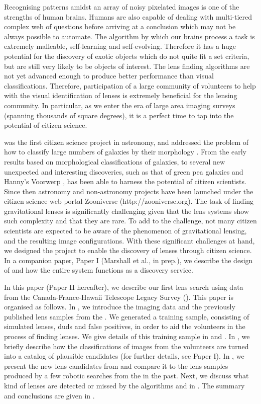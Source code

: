 \documentclass[useAMS,usenatbib,a4paper]{mn2e}
\begin{document}
Recognising patterns amidst an array of noisy pixelated images is one of the
strengths of human brains. Humans are also capable of dealing with
multi-tiered complex web of questions before arriving at a conclusion which may
not be always possible to automate. The algorithm by which our brains process a
task is extremely malleable, self-learning and self-evolving. Therefore it has
a huge potential for the discovery of exotic objects which do not quite fit a
set criteria, but are still very likely to be objects of interest. The lens
finding algorithms are not yet advanced enough to produce better performance
than visual classifications. Therefore, participation of a large community of
volunteers to help with the visual identification of lenses is extremely
beneficial for the lensing community. In particular, as we enter the era of
large area imaging surveys (spanning thousands of square degrees), it is
a perfect time to tap into the potential of citizen science.

\GZ was the first citizen science project in astronomy, and addressed
the problem of how to  classify large numbers of galaxies by their
morphology \citep{Lintott2008}.  From the early results based on
morphological classifications of galaxies, to several new unexpected and
interesting discoveries, such as that of green pea galaxies
\citep{Cardamone2009,Jaskot2013} and Hanny's Voorwerp
\citep{Lintott2009,Keel2012}, \GZ has been able to harness the potential
of citizen scientists.  Since then astronomy and non-astronomy projects
have been launched under the citizen science web portal Zooniverse
(http://zooniverse.org). The task of finding gravitational lenses is
significantly challenging given that the lens systems show such
complexity and that they are rare. To add to the challenge, not many
citizen scientists are expected to be aware of the phenomenon of
gravitational lensing, and the resulting image configurations.  With
these significant challenges at hand, we designed the \sw project to
enable the discovery of lenses through citizen science.  In a companion
paper, Paper I (Marshall et al., in prep.), we describe the design of
\sw and how the entire system functions as a discovery service.

In this paper (Paper II hereafter), we describe our first lens search
using data from the Canada-France-Hawaii Telescope Legacy Survey
(\cfhtls). This paper is organised as follows. In
, we introduce the \cfhtls imaging data and the
previously published lens samples from the \cfhtls. We generated a training sample, 
consisting of simulated lenses, duds and false positives, in order to
aid the \sw volunteers in the process of finding lenses. We give details of this
training sample in  and . In ,
we briefly describe how the classifications of images from the volunteers are
turned into a catalog of plausible candidates (for further details, see
Paper I). In , we present the new lens candidates from \sw and
compare it to the lens samples produced by a few robotic searches from
the \cfhtls in the past. Next, we discuss what kind of lenses are detected
or missed by the algorithms and \sw in . The summary
and conclusions are given in .
\end{document}
